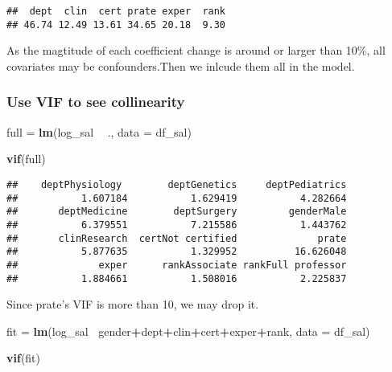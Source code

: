 \documentclass[]{article}
\newenvironment{Shaded}{\begin{snugshade}}{\end{snugshade}}
\newcommand{\DataTypeTok}[1]{\textcolor[rgb]{0.13,0.29,0.53}{#1}}
\newcommand{\KeywordTok}[1]{\textcolor[rgb]{0.13,0.29,0.53}{\textbf{#1}}}
\newcommand{\NormalTok}[1]{#1}
\newcommand{\OperatorTok}[1]{\textcolor[rgb]{0.81,0.36,0.00}{\textbf{#1}}}
\newcommand{\StringTok}[1]{\textcolor[rgb]{0.31,0.60,0.02}{#1}}
\begin{document}
\begin{verbatim}
##  dept  clin  cert prate exper  rank 
## 46.74 12.49 13.61 34.65 20.18  9.30
\end{verbatim}

As the magtitude of each coefficient change is around or larger than
10\%, all covariates may be confounders.Then we inlcude them all in the
model.

\hypertarget{use-vif-to-see-collinearity}{%
\subsubsection{Use VIF to see
collinearity}\label{use-vif-to-see-collinearity}}

\begin{Shaded}
\begin{Highlighting}[]
\NormalTok{full =}\StringTok{ }\KeywordTok{lm}\NormalTok{(log_sal }\OperatorTok{~}\StringTok{ }\NormalTok{., }\DataTypeTok{data =}\NormalTok{ df_sal)}

\KeywordTok{vif}\NormalTok{(full)}
\end{Highlighting}
\end{Shaded}

\begin{verbatim}
##    deptPhysiology        deptGenetics     deptPediatrics 
##           1.607184           1.629419           4.282664 
##       deptMedicine        deptSurgery         genderMale 
##           6.379551           7.215586           1.443762 
##       clinResearch  certNot certified              prate 
##           5.877635           1.329952          16.626048 
##              exper      rankAssociate rankFull professor 
##           1.884661           1.508016           2.225837
\end{verbatim}

Since prate's VIF is more than 10, we may drop it.

\begin{Shaded}
\begin{Highlighting}[]
\NormalTok{fit =}\StringTok{ }\KeywordTok{lm}\NormalTok{(log_sal }\OperatorTok{~}\NormalTok{gender}\OperatorTok{+}\NormalTok{dept}\OperatorTok{+}\NormalTok{clin}\OperatorTok{+}\NormalTok{cert}\OperatorTok{+}\NormalTok{exper}\OperatorTok{+}\NormalTok{rank, }\DataTypeTok{data =}\NormalTok{ df_sal)}

\KeywordTok{vif}\NormalTok{(fit)}
\end{Highlighting}
\end{Shaded}
\end{document}
